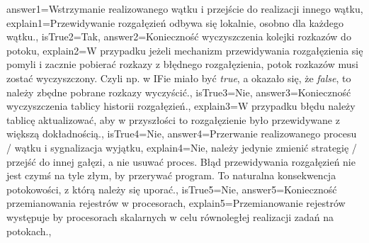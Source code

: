 \begin{enumerate}
\begin{minipage}{\textwidth}
{		answer1={Wstrzymanie realizowanego wątku i przejście do realizacji innego wątku},%
		explain1={Przewidywanie rozgałęzień odbywa się lokalnie, osobno dla każdego wątku.},%
		isTrue2={Tak},%
		answer2={Konieczność wyczyszczenia kolejki rozkazów do potoku},%
		explain2={W przypadku jeżeli mechanizm przewidywania rozgałęzienia się pomyli i zacznie pobierać rozkazy z błędnego rozgałęzienia, potok rozkazów musi zostać wyczyszczony. Czyli np. w IFie miało być \emph{true}, a okazało się, że \emph{false}, to należy zbędne pobrane rozkazy wyczyścić.},%
		isTrue3={Nie},%
		answer3={Konieczność wyczyszczenia tablicy historii rozgałęzień.},%
		explain3={W przypadku błędu należy tablicę aktualizować, aby w przyszłości to rozgałęzienie było przewidywane z większą dokładnością.},%
		isTrue4={Nie},%
		answer4={Przerwanie realizowanego procesu / wątku i sygnalizacja wyjątku},%
		explain4={Nie, należy jedynie zmienić strategię / przejść do innej gałęzi, a nie usuwać proces. Błąd przewidywania rozgałęzień nie jest czymś na tyle złym, by przerywać program. To naturalna konsekwencja potokowości, z którą należy się uporać.},%
		isTrue5={Nie},%
		answer5={Konieczność przemianowania rejestrów w procesorach}, %
		explain5={Przemianowanie rejestrów występuje by procesorach skalarnych w celu równoległej realizacji zadań na potokach.}, %
	}
\end{minipage}
\begin{minipage}{\textwidth}
\end{minipage}
\end{enumerate}
